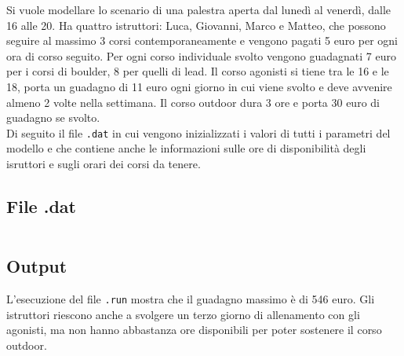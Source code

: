 Si vuole modellare lo scenario di una palestra aperta dal lunedì al venerdì, dalle 16 alle 20. Ha quattro istruttori: Luca, Giovanni, Marco e Matteo, che possono seguire al massimo 3 corsi contemporaneamente e vengono pagati 5 euro per ogni ora di corso seguito. Per ogni corso individuale svolto vengono guadagnati 7 euro per i corsi di boulder, 8 per quelli di lead. Il corso agonisti si tiene tra le 16 e le 18, porta un guadagno di 11 euro ogni giorno in cui viene svolto e deve avvenire almeno 2 volte nella settimana. Il corso outdoor dura 3 ore e porta 30 euro di guadagno se svolto. \\
Di seguito il file \texttt{.dat} in cui vengono inizializzati i valori di tutti i parametri del modello e che contiene anche le informazioni sulle ore di disponibilità degli isruttori e sugli orari dei corsi da tenere.

\subsection{File .dat}
\inputminted[bgcolor=bg, breaklines, fontsize=\small]{haskell}{opl/scenario-1.dat}

\subsection{Output}
L'esecuzione del file \texttt{.run} mostra che il guadagno massimo è di 546 euro. Gli istruttori riescono anche a svolgere un terzo giorno di allenamento con gli agonisti, ma non hanno abbastanza ore disponibili per poter sostenere il corso outdoor.
